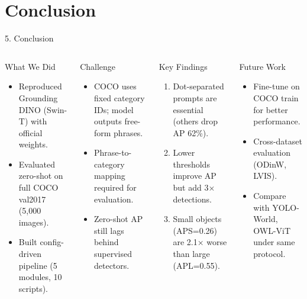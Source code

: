 \documentclass[aspectratio=169,10pt]{beamer}
\begin{document}
\section{Conclusion}

\begin{frame}{5. Conclusion}
  \vspace{-0.2cm}
  \begin{columns}[T]

    \begin{block}{What We Did}
      \footnotesize
      \begin{itemize}\setlength{\itemsep}{5pt}
        \item Reproduced Grounding DINO (Swin-T) with official weights.
        \item Evaluated zero-shot on full COCO val2017 (5,000 images).
        \item Built config-driven pipeline (5 modules, 10 scripts).
      \end{itemize}
    \end{block}
    \vspace{0.08cm}
    \begin{block}{Challenge}
      \footnotesize
      \begin{itemize}\setlength{\itemsep}{5pt}
        \item COCO uses fixed category IDs; model outputs free-form phrases.
        \item Phrase-to-category mapping required for evaluation.
        \item Zero-shot AP still lags behind supervised detectors.
      \end{itemize}
    \end{block}

    \begin{block}{Key Findings}
      \footnotesize
      \begin{enumerate}\setlength{\itemsep}{5pt}
        \item Dot-separated prompts are essential (others drop AP 62\%).
        \item Lower thresholds improve AP but add 3× detections.
        \item Small objects (APS=0.26) are 2.1× worse than large (APL=0.55).
      \end{enumerate}
    \end{block}
    \vspace{0.08cm}
    \begin{block}{Future Work}
      \footnotesize
      \begin{itemize}\setlength{\itemsep}{5pt}
        \item Fine-tune on COCO train for better performance.
        \item Cross-dataset evaluation (ODinW, LVIS).
        \item Compare with YOLO-World, OWL-ViT under same protocol.
      \end{itemize}
    \end{block}


\end{columns}
\end{frame}
\end{document}
